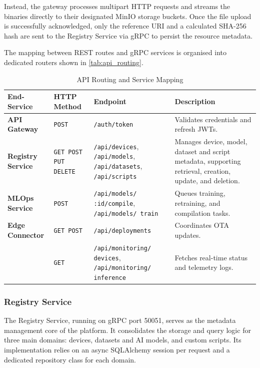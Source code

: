 Instead, the gateway processes multipart \gls{HTTP} requests and streams the binaries directly to their designated MinIO storage buckets. Once the file upload is successfully acknowledged, only the reference \gls{URI} and a calculated SHA-256 hash are sent to the Registry Service via \gls{gRPC} to persist the resource metadata.

The mapping between \gls{REST} routes and \gls{gRPC} services is organised into dedicated routers shown in \autoref{tab:api_routing}.

\begin{table}[H]
    \centering
    \caption{\acrshort{API} Routing and Service Mapping}
    \label{tab:api_routing}
    \begin{tabular}{p{}
                    p{}
                    p{}
                    p{}}
        \hline
        \textbf{End-Service} & \textbf{\gls{HTTP} Method} & \textbf{Endpoint} & \textbf{Description} \\
        \hline
        \textbf{\gls{API} Gateway} & \texttt{POST} & \texttt{/auth/token} & Validates credentials and refresh \glspl{JWT}. \\
        \hline
        \textbf{Registry Service} & \texttt{GET POST PUT DELETE} & \texttt{/api/devices}, \texttt{/api/models}, \texttt{/api/datasets}, \texttt{/api/scripts} & Manages device, model, dataset and script metadata, supporting retrieval, creation, update, and deletion. \\
        \hline
        \textbf{\gls{MLOps} Service} & \texttt{POST} & \texttt{/api/models/ :id/compile}, \texttt{/api/models/ train} & Queues training, retraining, and compilation tasks. \\
        \hline
        \textbf{Edge Connector} & \texttt{GET POST} & \texttt{/api/deployments} & Coordinates \gls{OTA} updates. \\
        & \texttt{GET} & \texttt{/api/monitoring/ devices}, \texttt{/api/monitoring/ inference} & Fetches real-time status and telemetry logs. \\
        \hline
    \end{tabular}
\end{table}

\subsubsection{Registry Service}\label{sec:impl:registry_svc}

The Registry Service, running on \gls{gRPC} port 50051, serves as the metadata management core of the platform. It consolidates the storage and query logic for three main domains: devices, datasets and \gls{AI} models, and custom scripts. Its implementation relies on an async SQLAlchemy session per request and a dedicated repository class for each domain.

